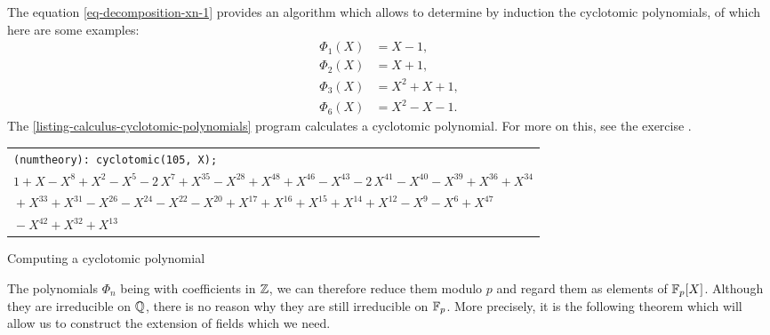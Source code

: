 \begin{exmp}
The equation \eqref{eq-decomposition-xn-1} provides an algorithm which allows to determine by induction the cyclotomic polynomials, of which here are some examples:
\begin{equation*}
\begin{split}
\Phi_1 (X) & = X - 1, \\
\Phi_2 (X) & = X + 1, \\
\Phi_3 (X) & = X^2 + X + 1, \\
\Phi_6 (X) & = X^2 - X - 1.
\end{split}
\end{equation*}
 The \Maple{} \ref{listing-calculus-cyclotomic-polynomials} program calculates a cyclotomic polynomial. For more on this, see the exercise .
 
\begin{listing} \begin{footnotesize}
{\upshape
\begin{tabular}{l}
\texttt{\pwith{}(numtheory): cyclotomic(105, X);} \\
\texttt{$ 1 + X - X^{8} + X^{2} - X^{5} - 2 \, X^{7} + X^{35} - X^{28} + X^{48 } + X^{46} - X^{43} - 2 \, X^{41} - X^{40} - X^{39} + X^{36} + X^{34} $} \\\texttt{$ \mbox{} + X^{33} + X^{31} - X^{26} - X^{24} - X^{22} - X^{20} + X^{17} + X^{16} + X^{15} + X^{14} + X^{12} - X^{9} - X^{6} + X^{47} $} \\\texttt{$ \mbox{} - X^{42} + X^{32} + X^{13} $} \\
\end{tabular}
}
\end{footnotesize}
\caption{Computing a cyclotomic polynomial}
\label{listing-calculus-cyclotomic-polynomials}
\end{listing}
 
\end{exmp}
 
 
 
The polynomials $ \Phi_n $ being with coefficients in $ \mathbb{Z} $, we can therefore reduce them modulo $ p $ and regard them as elements of $ \mathbb{F}_p [X] $. Although they are irreducible on $ \mathbb{Q} $, there is no reason why they are still irreducible on $ \mathbb{F}_p $. More precisely, it is the following theorem which will allow us to construct the extension of fields which we need.
 
